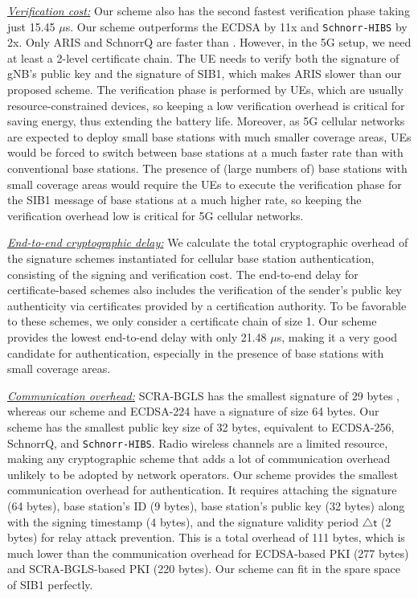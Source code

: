 \noindent \textit{\underline{Verification cost:}} Our scheme also has the second fastest verification phase taking just 15.45 $\mu$s. Our scheme outperforms the ECDSA by 11x and \texttt{Schnorr-HIBS} by 2x. Only ARIS and SchnorrQ are faster than \scheme{}. However, in the 5G setup, we need at least a 2-level certificate chain. The UE needs to verify both the signature of gNB's public key and the signature of SIB1, which makes ARIS slower than our proposed scheme. 
The verification phase is performed by UEs, which are usually resource-constrained devices, so keeping a low verification overhead is critical for saving energy, thus extending the battery life. Moreover, as 5G cellular networks are expected to deploy small base stations with much smaller coverage areas, UEs would be forced to switch between base stations at a much faster rate than with conventional base stations. 
The presence of (large numbers of) base stations with small coverage areas would require the UEs to execute the verification phase for the SIB1 message of base stations at a much higher rate, so keeping the verification overhead low is critical for 5G cellular networks. 

\noindent \textit{\underline{End-to-end cryptographic delay:}} We calculate the total cryptographic overhead of the signature schemes instantiated for cellular base station authentication, consisting of the signing and verification cost. The end-to-end delay for certificate-based schemes also includes the verification of the sender's public key authenticity via certificates provided by a certification authority. To be favorable to these schemes, we only consider a certificate chain of size 1. Our scheme provides the lowest end-to-end delay with only 21.48 $\mu$s, making it a very good candidate for authentication, especially in the presence of base stations with small coverage areas. 

\noindent \textit{\underline{Communication overhead:}} SCRA-BGLS has the smallest signature of 29 bytes 
, whereas our scheme \scheme{} and ECDSA-224 have a signature of size 64 bytes. Our scheme has the smallest public key size of 32 bytes, equivalent to ECDSA-256, SchnorrQ, and \texttt{Schnorr-HIBS}. Radio wireless channels are a limited resource, making any cryptographic scheme that adds a lot of communication overhead unlikely to be adopted by network operators. Our scheme provides the smallest communication overhead for authentication. It requires attaching the \scheme{} signature (64 bytes), base station's ID (9 bytes), base station's public key (32 bytes) along with the signing timestamp (4 bytes), and the signature validity period $\mathsf{\bigtriangleup t}$ (2 bytes) for relay attack prevention. This is a total overhead of 111 bytes, which is much lower than the communication overhead for ECDSA-based PKI (277 bytes) and SCRA-BGLS-based PKI (220 bytes). Our scheme can fit in the spare space of SIB1 perfectly. 

